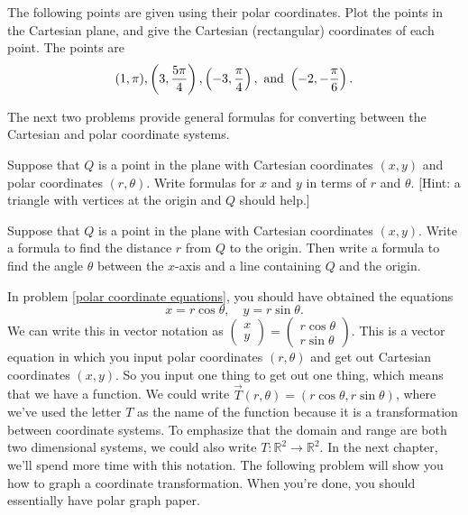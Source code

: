 \begin{problem}  
The following points are given using their polar coordinates.  Plot the points in the Cartesian plane, and give the Cartesian (rectangular) coordinates of each point. The points are
$$
(1,\pi), 
\displaystyle \left( 3,\frac{5\pi}{4}\right),
\displaystyle \left( -3,\frac{\pi}{4}\right),\text{ and }
\displaystyle \left( -2,-\frac{\pi}{6}\right).$$
\end{problem}

The next two problems provide general formulas for converting between the Cartesian and polar coordinate systems.

\begin{problem}\label{polar coordinate equations}  
Suppose that $Q$ is a point in the plane with Cartesian coordinates $(x,y)$ and polar coordinates $(r,\theta)$.  Write formulas for $x$ and $y$ in terms of $r$ and $\theta$. [Hint: a triangle with vertices at the origin and $Q$ should help.]
\end{problem}

\begin{problem} 
Suppose that $Q$ is a point in the plane with Cartesian coordinates $(x,y)$.  Write a formula to find the distance $r$ from $Q$ to the origin. Then write a formula to find the angle $\theta$ between the $x$-axis and a line containing $Q$ and the origin.
\end{problem}

In problem \ref{polar coordinate equations}, you should have obtained the equations 
$$x=r\cos\theta, \quad y=r\sin\theta.$$
We can write this in vector notation as $\begin{pmatrix}x\\y\end{pmatrix}=\begin{pmatrix}r\cos\theta\\ r\sin\theta\end{pmatrix}$.
This is a vector equation in which you input polar coordinates $(r,\theta)$ and get out Cartesian coordinates $(x,y)$.  
So you input one thing to get out one thing, which means that we have a function.  
We could write $\vec T(r,\theta) = (r\cos\theta,r\sin\theta)$, where we've used the letter $T$ as the name of the function because it is a transformation between coordinate systems. 
To emphasize that the domain and range are both two dimensional systems, we could also write $T:\mathbb{R}^2\to\mathbb{R}^2$. In the next chapter, we'll spend more time with this notation. The following problem will show you how to graph a coordinate transformation.  When you're done, you should essentially have polar graph paper.

